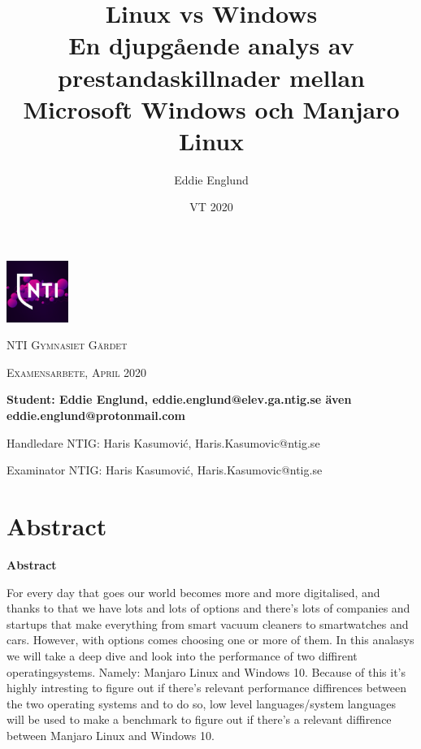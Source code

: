 \documentclass[12pt, a4paper]{report}
\author{Eddie Englund}
\title{Linux vs Windows\\[0.2em]\smaller{}En djupgående analys av prestandaskillnader mellan Microsoft Windows och Manjaro Linux}
\date{VT 2020}
\makeatletter
\renewcommand*{\abstractname}{Abstract}
\renewenvironment{abstract}{%
    \if@twocolumn
    \renewcommand*{\abstractname}{Abstract}

      \section*{\abstractname}%
    \else %
      \begin{flushleft}%
        \renewcommand*{\abstractname}{Abstract}

        {\bfseries \Large\abstractname\vspace{\z@}}%
      \end{flushleft}%
      \quotation
    \fi}
    {\if@twocolumn\else\endquotation\fi}
\makeatother
\begin{document}
\begin{titlepage}
    \maketitle

    \begin{center}
        \thispagestyle{empty}
    
        \includegraphics[width=0.15\textwidth]{nti.png}\par\vspace{1cm}

    {\scshape\LARGE NTI Gymnasiet Gärdet \par}
    \vspace{1cm}
    {\scshape\Large Examensarbete, April 2020\par}
	\vspace{1.5cm}
    \textbf{
    Student: Eddie Englund, eddie.englund@elev.ga.ntig.se även eddie.englund@protonmail.com}
    \vspace{0.2cm}

    Handledare NTIG: Haris Kasumović, Haris.Kasumovic@ntig.se
    \vspace{0.1cm}

    Examinator NTIG: Haris Kasumović, Haris.Kasumovic@ntig.se
    
    \end{center}
\end{titlepage}

\setlength{\cftbeforetoctitleskip}{-3em}
\tableofcontents

\vspace{2cm}
\begin{abstract}

For every day that goes our world becomes more and more digitalised, and thanks to that we have lots and lots of options and there's lots of companies and startups that make everything from smart vacuum cleaners to smartwatches and cars. However, with options comes choosing one or more of them. In this analasys we will take a deep dive and look into the performance of two diffirent operatingsystems. Namely: Manjaro Linux and Windows 10. Because of this it's highly intresting to figure out if there's relevant performance diffirences between the two operating systems and to do so, low level languages/system languages will be used to make a benchmark to figure out if there's a relevant diffirence between Manjaro Linux and Windows 10.

\end{abstract}
\end{document}
